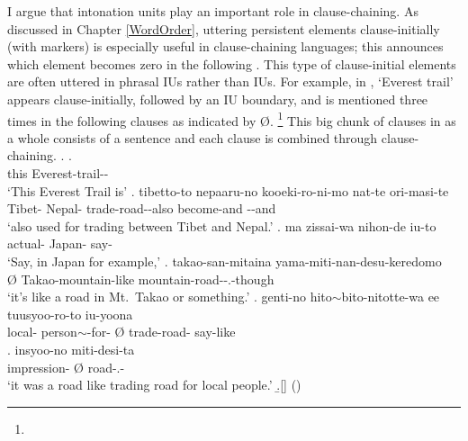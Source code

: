 I argue that intonation units play an important role in clause-chaining.
As discussed in Chapter \ref{WordOrder},
uttering persistent elements clause-initially (with  markers) is especially useful in clause-chaining languages;
this announces which element becomes zero in the following .
This type of clause-initial elements are often uttered in phrasal IUs rather than  IUs.
For example, in \Next,
 `Everest trail' appears clause-initially,
followed by an IU boundary,
and is mentioned three times in the following clauses as indicated by {\O}.%
 \footnote{
 }
This big chunk of clauses in \Next as a whole consists of a sentence and
each clause is combined through clause-chaining.
%
\ex.
\ag.   {\tp{\dvline}} \\
	this Everest-trail-- {} \\
	`{This Everest Trail} is'
\bg. tibetto-to nepaaru-no \tp{\dvline} kooeki-ro-ni-mo nat-te ori-masi-te\tp{\dvline} \\
	Tibet- Nepal- {} trade-road--also become-and --and \\
	`also used for trading  between Tibet and Nepal.'
\cg. ma zissai-wa nihon-de iu-to \tp{\dvline} \\
	 actual- Japan- say- {} \\
	`Say, in Japan for example,'
\dg. \EM{\O} takao-san-mitaina \tp{\dvline} yama-miti-nan-desu-keredomo \tp{\dvline} \\
	{\O} Takao-mountain-like {} mountain-road--.-though {} \\
	`it's like a road in Mt.\ Takao or something.'
\eg. genti-no hito$\sim$bito-nitotte-wa \tp{\dvline} ee \tp{\dvline} \EM{\O} tuusyoo-ro-to \tp{\dvline} iu-yoona \\
	local- person$\sim$-for- {}  {} {\O} trade-road- {} say-like \\
\bg. insyoo-no \EM{\O} miti-desi-ta \tp{\dvline} \\
	 impression- {\O} road-.- {} \\
 `{it} was a road like trading road for local people.'
 \b.[] \hfill{()}

